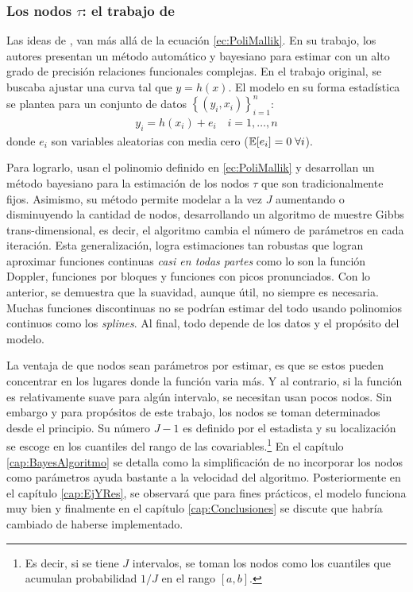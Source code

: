 \documentclass[../Main/Main.tex]{subfiles}
\begin{document}
\subsubsection*{Los nodos $\tau$: el trabajo de \citeauthor{mallik1998automatic}}
Las ideas de \citet{mallik1998automatic}, van más allá de la ecuación \eqref{ec:PoliMallik}. En su trabajo, los autores presentan un método automático y bayesiano para estimar con un alto grado de precisión relaciones funcionales complejas. En el trabajo original, se buscaba ajustar una curva tal que $y = h(x)$. El modelo en su forma estadística se plantea para un conjunto de datos $\left\{(y_i,x_i) \right\}_{i = 1}^n$:
\begin{align}
	y_i = h(x_i) + e_i \quad i = 1,\ldots,n \label{ec:ModeloGral}
\end{align}
donde $e_i$ son variables aleatorias con media cero ($\mathbb{E}[e_i] = 0 \; \forall i$).  

Para lograrlo, usan el polinomio definido en \eqref{ec:PoliMallik} y desarrollan un método bayesiano para la estimación de los nodos $\tau$ que son tradicionalmente fijos. Asimismo, su método permite modelar a la vez $J$ aumentando o disminuyendo la cantidad de nodos, desarrollando un algoritmo de muestre Gibbs trans-dimensional, es decir, el algoritmo cambia el número de parámetros en cada iteración. Esta generalización, logra estimaciones tan robustas que logran aproximar funciones continuas \textit{casi en todas partes} como lo son la función Doppler, funciones por bloques y funciones con picos pronunciados. Con lo anterior, se demuestra que la suavidad, aunque útil, no siempre es necesaria. Muchas funciones discontinuas no se podrían estimar del todo usando polinomios continuos como los \textit{splines}. Al final, todo depende de los datos y el propósito del modelo.

La ventaja de que nodos sean parámetros por estimar, es que se estos pueden concentrar en los lugares donde la función varia más. Y al contrario, si la función es relativamente suave para algún intervalo, se necesitan usan pocos nodos. Sin embargo y para propósitos de este trabajo, los nodos se toman determinados desde el principio. Su número $J-1$ es definido por el estadista y su localización se escoge en los cuantiles del rango de las covariables.\footnote{Es decir, si se tiene $J$ intervalos, se toman los nodos como los  cuantiles que acumulan probabilidad $1/J$ en el rango $[a,b]$.} En el capítulo \ref{cap:BayesAlgoritmo} se detalla como la simplificación de no incorporar los nodos como parámetros ayuda bastante a la velocidad del algoritmo. Posteriormente en el capítulo \ref{cap:EjYRes}, se observará que para fines prácticos, el modelo funciona muy bien y finalmente en el capítulo \ref{cap:Conclusiones} se discute que habría cambiado de haberse implementado. 
\end{document}
